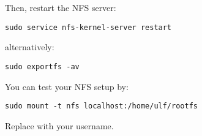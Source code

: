 Then, restart the NFS server:

\begin{verbatim}
sudo service nfs-kernel-server restart
\end{verbatim}

alternatively:

\begin{verbatim}
sudo exportfs -av
\end{verbatim}

You can test your NFS setup by:

\begin{verbatim}
sudo mount -t nfs localhost:/home/ulf/rootfs
\end{verbatim}

Replace  with your username.
